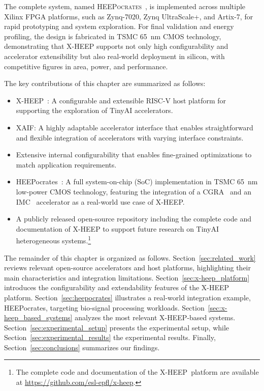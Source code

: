         The complete system, named \textsc{HEEPocrates}~\cite{heepocrates}, is implemented across multiple Xilinx FPGA platforms, such as Zynq-7020, Zynq UltraScale+, and Artix-7, for rapid prototyping and system exploration. For final validation and energy profiling, the design is fabricated in TSMC \SI{65}{\nano\meter} CMOS technology, demonstrating that \mbox{X-HEEP} supports not only high configurability and accelerator extensibility but also real-world deployment in silicon, with competitive figures in area, power, and performance.

        The key contributions of this chapter are summarized as follows:

        \vspace{-1em}
        \begin{itemize}
            \item \mbox{X-HEEP}~\cite{x-heep}: A configurable and extensible RISC-V host platform for supporting the exploration of TinyAI accelerators.
    
            \item \mbox{XAIF}: A highly adaptable accelerator interface that enables straightforward and flexible integration of accelerators with varying interface constraints.

            \item Extensive internal configurability that enables fine-grained optimizations to match application requirements.
    
            \item \mbox{HEEPocrates}~\cite{heepocrates}: A full system-on-chip (SoC) implementation in TSMC \SI{65}{\nano\meter} low-power CMOS technology, featuring the integration of a CGRA~\cite{oe-cgra} and an IMC~\cite{blade} accelerator as a real-world use case of \mbox{X-HEEP}.
    
            \item A publicly released open-source repository including the complete code and documentation of \mbox{X-HEEP} to support future research on TinyAI heterogeneous systems.\footnote{The complete code and documentation of the \mbox{X-HEEP platform} are available at \url{https://github.com/esl-epfl/x-heep}.}
        \end{itemize}
        \vspace{-1em}
        
        The remainder of this chapter is organized as follows. Section~\ref{sec:related_work} reviews relevant open-source accelerators and host platforms, highlighting their main characteristics and integration limitations. Section~\ref{sec:x-heep_platform} introduces the configurability and extendability features of the \mbox{X-HEEP} platform. Section~\ref{sec:heepocrates} illustrates a real-world integration example, \mbox{HEEPocrates}, targeting bio-signal processing workloads. Section~\ref{sec:x-heep_based_systems} analyzes the most relevant \mbox{X-HEEP}-based systems. Section~\ref{sec:experimental_setup} presents the experimental setup, while Section~\ref{sec:experimental_results} the experimental results. Finally, Section~\ref{sec:conclusions} summarizes our findings.

